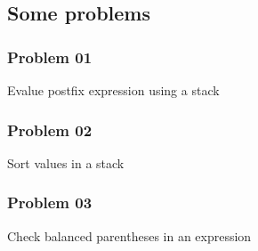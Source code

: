 \subsection{Some problems}
\subsubsection{Problem 01}
\textsf{Evalue postfix expression using a stack}

\subsubsection{Problem 02}
\textsf{Sort values in a stack}


\subsubsection{Problem 03}
\textsf{Check balanced parentheses in an expression}

